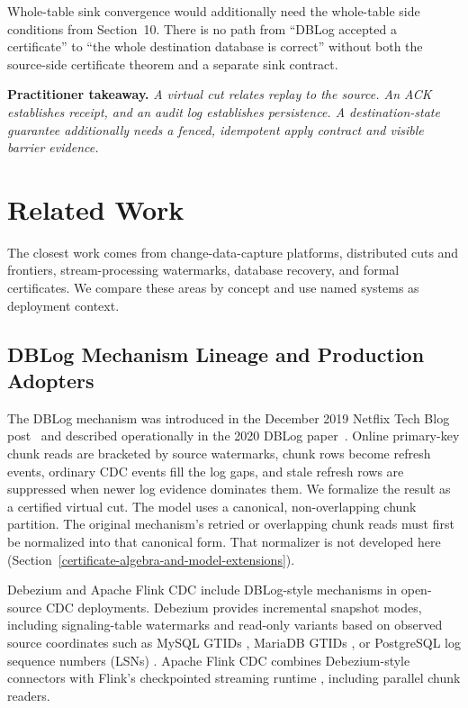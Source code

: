 \documentclass[letterpaper,10pt,twocolumn]{article}
\begin{document}
Whole-table sink convergence would additionally need the whole-table
side conditions from Section~10. There is no path from ``DBLog accepted
a certificate'' to ``the whole destination database is correct'' without
both the source-side certificate theorem and a separate sink contract.

\smallskip
\noindent\textbf{Practitioner takeaway.} \emph{A virtual cut relates
replay to the source. An ACK establishes receipt, and an audit log
establishes persistence. A destination-state guarantee additionally
needs a fenced, idempotent apply contract and visible barrier evidence.}

\section{Related Work}\label{related-work}

The closest work comes from change-data-capture platforms, distributed
cuts and frontiers, stream-processing watermarks, database recovery,
and formal certificates. We compare these areas by concept and use
named systems as deployment context.

\subsection{DBLog Mechanism Lineage and Production
Adopters}\label{dblog-mechanism-lineage-and-production-adopters}

The DBLog mechanism was introduced in the December 2019 Netflix Tech
Blog post~\citep{dblog_netflix_blog} and described operationally in the
2020 DBLog paper~\citep{andreakis2020dblog}. Online primary-key chunk reads
are bracketed by source watermarks, chunk rows become refresh events,
ordinary CDC events fill the log gaps, and stale refresh rows are
suppressed when newer log evidence dominates them. We formalize the
result as a certified virtual cut. The model uses a canonical,
non-overlapping chunk partition. The original mechanism's retried or
overlapping chunk reads must first be normalized into that canonical
form. That normalizer is not developed here
(Section~\ref{certificate-algebra-and-model-extensions}).

Debezium \citep{debezium_incremental_snapshot} and Apache Flink
CDC \citep{flink_cdc_incremental_snapshot} include DBLog-style
mechanisms in open-source CDC deployments. Debezium provides
incremental snapshot modes, including signaling-table watermarks and
read-only variants based on observed source coordinates such as MySQL
GTIDs \citep{mysql_binlog}, MariaDB GTIDs \citep{mariadb_binlog}, or
PostgreSQL log sequence numbers (LSNs) \citep{postgres_logical_decoding}.
Apache Flink CDC combines Debezium-style connectors with Flink's
checkpointed streaming runtime \citep{carbone2015asynchronous},
including parallel chunk readers.
\end{document}
